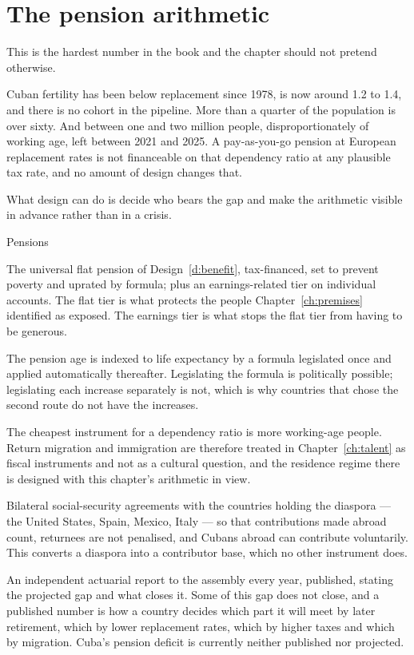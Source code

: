 \section{The pension arithmetic}

This is the hardest number in the book and the chapter should not pretend
otherwise.

Cuban fertility has been below replacement since 1978, is now around 1.2 to 1.4,
and there is no cohort in the pipeline. More than a quarter of the population is
over sixty. And between one and two million people, disproportionately of
working age, left between 2021 and 2025. A pay-as-you-go pension at European
replacement rates is not financeable on that dependency ratio at any plausible
tax rate, and no amount of design changes that.

What design can do is decide who bears the gap and make the arithmetic visible
in advance rather than in a crisis.

\begin{design}{Pensions}
\label{d:pension}
\begin{rules}
 The universal flat pension of Design~\ref{d:benefit},
tax-financed, set to prevent poverty and uprated by formula; plus an
earnings-related tier on individual accounts. The flat tier is what protects the
people Chapter~\ref{ch:premises} identified as exposed. The earnings tier is
what stops the flat tier from having to be generous.

 The pension age is indexed to life expectancy by
a formula legislated once and applied automatically thereafter. Legislating the
formula is politically possible; legislating each increase separately is not,
which is why countries that chose the second route do not have the increases.

 The cheapest instrument for a dependency
ratio is more working-age people. Return migration and immigration are therefore
treated in Chapter~\ref{ch:talent} as fiscal instruments and not as a cultural
question, and the residence regime there is designed with this chapter's
arithmetic in view.

 Bilateral social-security agreements with the countries
holding the diaspora --- the United States, Spain, Mexico, Italy --- so that
contributions made abroad count, returnees are not penalised, and Cubans abroad
can contribute voluntarily. This converts a diaspora into a contributor base,
which no other instrument does.

 An independent actuarial report to the assembly every
year, published, stating the projected gap and what closes it. Some of this gap
does not close, and a published number is how a country decides which part it
will meet by later retirement, which by lower replacement rates, which by
higher taxes and which by migration. Cuba's pension deficit is currently
neither published nor projected.
\end{rules}
\end{design}

